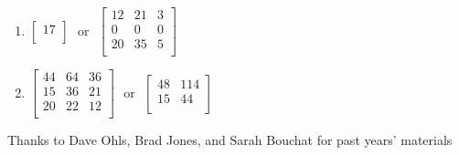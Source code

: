 \documentclass[11pt]{article}
\begin{document}
\begin{enumerate}
\begin{enumerate}
\item $\left[\begin{array}{c}
17 \\
\end{array}\right]
~~~\textrm{or}~~~
\left[\begin{array}{ccc}
12 & 21 & 3 \\
0  & 0  & 0 \\
20 & 35 & 5 \\
\end{array}\right]$
\item $\left[\begin{array}{ccc}
44 & 64 & 36 \\
15 & 36 & 21 \\
20 & 22 & 12 \\
\end{array}\right]
~~~\textrm{or}~~~
\left[\begin{array}{cc}
48 & 114 \\
15 & 44 \\
\end{array}\right]$
\end{enumerate}



\end{enumerate}




\vfill
\begin{center}
\small{Thanks to Dave Ohls, Brad Jones, and Sarah Bouchat for past years' materials}
\end{center}
\end{document}
